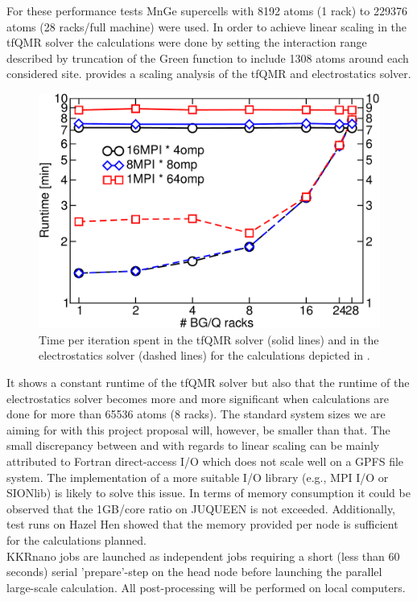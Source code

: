 \documentclass [a4paper, 12pt]{article}
\begin{document}
For these performance tests MnGe supercells
with 8192 atoms (1 rack) to 229376 atoms (28 racks/full machine) were used.
In order to achieve linear scaling in the tfQMR solver the calculations were 
done by setting the interaction range described by truncation of the Green function to include 
1308 atoms around each considered site.
 provides a scaling analysis of the tfQMR and electrostatics solver.
\begin{figure}[h]
\begin{center}
 \includegraphics[scale=0.45]{Figures/combinedtfqmrelectrostatics.pdf}
\end{center}
\caption{Time per iteration spent in the tfQMR solver (solid lines) 
	and in the electrostatics solver (dashed lines) for the calculations depicted in
	.}
\label{fig:tfqmr_es_times}
\end{figure}
It shows 
a constant runtime of the tfQMR solver but also that the runtime of the electrostatics solver becomes
more and more significant when calculations are done for more than 65536 atoms (8 racks). 
The standard system sizes we are aiming
for with this project proposal will, however, be smaller than that.
The small discrepancy between  and  with regards to linear
scaling can be mainly attributed to Fortran direct-access I/O which does not scale well on a GPFS file system.
The implementation of a more suitable I/O library (e.g., MPI I/O or SIONlib) is likely to solve this issue.
In terms of memory consumption it could be observed that the 1GB/core ratio on JUQUEEN is not exceeded.
Additionally, test runs on Hazel Hen showed that the memory provided per node is sufficient for the calculations
planned.
\\
KKRnano jobs are launched as independent jobs requiring a short (less than 60 seconds) serial 'prepare'-step on
the head node
before launching the parallel large-scale calculation. All post-processing will be
performed on local computers.
\end{document}
